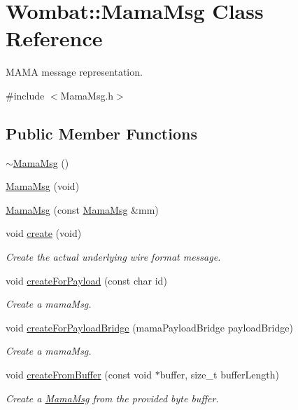 \hypertarget{classWombat_1_1MamaMsg}{
\section{Wombat::MamaMsg Class Reference}
\label{classWombat_1_1MamaMsg}
}


MAMA message representation.  


{\ttfamily \#include $<$MamaMsg.h$>$}\subsection*{Public Member Functions}
\begin{DoxyCompactItemize}
\item 
\hyperlink{classWombat_1_1MamaMsg_a455ca709ce0c3c45b869afb4e01e97e7}{$\sim$MamaMsg} ()
\item 
\hyperlink{classWombat_1_1MamaMsg_a830740c87dbf0d0e47439686d5cef778}{MamaMsg} (void)
\item 
\hyperlink{classWombat_1_1MamaMsg_a00d40118467e82990c47276cac401ee8}{MamaMsg} (const \hyperlink{classWombat_1_1MamaMsg}{MamaMsg} \&mm)
\item 
void \hyperlink{classWombat_1_1MamaMsg_ab064f6030112a708c63da5562ca35447}{create} (void)
\begin{DoxyCompactList}\small\item\em Create the actual underlying wire format message. \item\end{DoxyCompactList}\item 
void \hyperlink{classWombat_1_1MamaMsg_ac52ce35f2a056b274ddef0853f867024}{createForPayload} (const char id)
\begin{DoxyCompactList}\small\item\em Create a mamaMsg. \item\end{DoxyCompactList}\item 
void \hyperlink{classWombat_1_1MamaMsg_aea527bd1d49e7c9c074dd28dec412755}{createForPayloadBridge} (mamaPayloadBridge payloadBridge)
\begin{DoxyCompactList}\small\item\em Create a mamaMsg. \item\end{DoxyCompactList}\item 
void \hyperlink{classWombat_1_1MamaMsg_a1d0ba5880a0573a4689ee1d3f1d81a1b}{createFromBuffer} (const void $\ast$buffer, size\_\-t bufferLength)
\begin{DoxyCompactList}\small\item\em Create a \hyperlink{classWombat_1_1MamaMsg}{MamaMsg} from the provided byte buffer. \item\end{DoxyCompactList}\item 

\end{DoxyCompactItemize}
